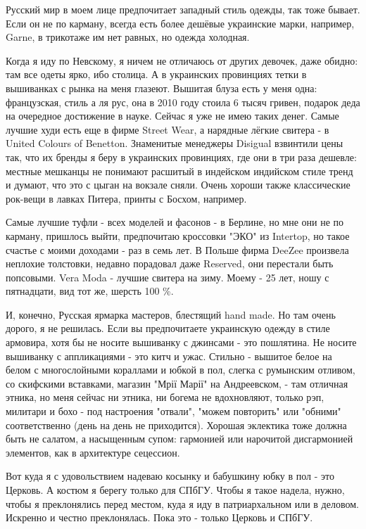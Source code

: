 Русский мир в моем лице предпочитает западный стиль одежды, так тоже бывает.
Если он не по карману, всегда есть более дешёвые украинские марки, например,
Garne, в трикотаже им нет равных, но одежда холодная.

Когда я иду по Невскому, я ничем не отличаюсь от других девочек, даже обидно:
там все одеты ярко, ибо столица. А в украинских провинциях тетки в вышиванках с
рынка на меня глазеют. Вышитая блуза есть у меня одна: французская, стиль а ля
рус, она в 2010 году стоила 6 тысяч гривен, подарок деда на очередное
достижение в науке. Сейчас я уже не имею таких денег. Самые лучшие худи есть
еще в фирме Street Wear, а нарядные лёгкие свитера - в United Colours of
Benetton. Знаменитые менеджеры Disigual взвинтили цены так, что их бренды я
беру в украинских провинциях, где они в три раза дешевле: местные мешканцы не
понимают расшитый в индейском индийском стиле тренд и думают, что это с цыган
на вокзале сняли. Очень хороши также классические рок-вещи в лавках Питера,
принты с Босхом, например.

Самые лучшие туфли - всех моделей и фасонов - в Берлине, но мне они не по
карману, пришлось выйти, предпочитаю кроссовки "ЭКО" из Intertop, но такое
счастье с моими доходами - раз в семь лет. В Польше фирма DeeZee произвела
неплохие толстовки, недавно порадовал даже Reserved, они перестали быть
попсовыми. Vera Moda - лучшие свитера на зиму. Моему - 25 лет, ношу с
пятнадцати, вид тот же, шерсть 100 \%.

И, конечно, Русская ярмарка мастеров, блестящий hand made. Но там очень дорого,
я не решилась. Если вы предпочитаете украинскую одежду в стиле армовира, хотя
бы не носите вышиванку с джинсами - это пошлятина. Не носите вышиванку с
аппликациями - это китч и ужас. Стильно - вышитое белое на белом с
многослойными кораллами и юбкой в пол, слегка с румынским отливом, со скифскими
вставками, магазин "Мрії Марії" на Андреевском, - там отличная этника, но меня
сейчас ни этника, ни богема не вдохновляют, только рэп, милитари и бохо - под
настроения "отвали", "можем повторить" или "обними" соответственно (день на
день не приходится). Хорошая эклектика тоже должна быть не салатом, а
насыщенным супом: гармонией или нарочитой дисгармонией элементов, как в
архитектуре сецессион.

Вот куда я с удовольствием надеваю косынку и бабушкину юбку в пол - это
Церковь. А костюм я берегу только для СПбГУ. Чтобы я такое надела, нужно, чтобы
я преклонялись перед местом, куда я иду в патриархальном или в деловом.
Искренно и честно преклонялась. Пока это - только Церковь и СПбГУ.

